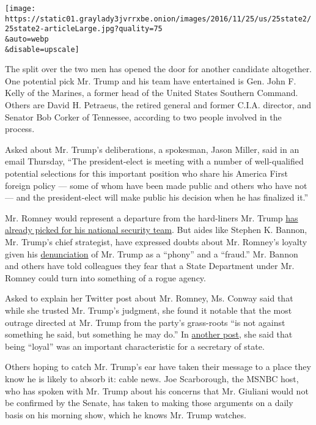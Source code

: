 \texttt{[image: https://static01.graylady3jvrrxbe.onion/images/2016/11/25/us/25state2/25state2-articleLarge.jpg?quality=75\\\&auto=webp\\\&disable=upscale]}

The split over the two men has opened the door for another candidate
altogether. One potential pick Mr. Trump and his team have entertained
is Gen. John F. Kelly of the Marines, a former head of the United States
Southern Command. Others are David H. Petraeus, the retired general and
former C.I.A. director, and Senator Bob Corker of Tennessee, according
to two people involved in the process.

Asked about Mr. Trump's deliberations, a spokesman, Jason Miller, said
in an email Thursday, ``The president-elect is meeting with a number of
well-qualified potential selections for this important position who
share his America First foreign policy --- some of whom have been made
public and others who have not --- and the president-elect will make
public his decision when he has finalized it.''

Mr. Romney would represent a departure from the hard-liners Mr. Trump
\href{http://www.nytimes3xbfgragh.onion/2016/11/19/us/politics/donald-trump-administration.html}{has
already picked for his national security team}. But aides like Stephen
K. Bannon, Mr. Trump's chief strategist, have expressed doubts about Mr.
Romney's loyalty given his
\href{http://www.nytimes3xbfgragh.onion/2016/03/04/us/politics/mitt-romney-speech.html}{denunciation}
of Mr. Trump as a ``phony'' and a ``fraud.'' Mr. Bannon and others have
told colleagues they fear that a State Department under Mr. Romney could
turn into something of a rogue agency.

Asked to explain her Twitter post about Mr. Romney, Ms. Conway said that
while she trusted Mr. Trump's judgment, she found it notable that the
most outrage directed at Mr. Trump from the party's grass-roots ``is not
against something he said, but something he may do.'' In
\href{https://twitter.com/KellyannePolls/status/801796408521138176}{another
post}, she said that being ``loyal'' was an important characteristic for
a secretary of state.

Others hoping to catch Mr. Trump's ear have taken their message to a
place they know he is likely to absorb it: cable news. Joe Scarborough,
the MSNBC host, who has spoken with Mr. Trump about his concerns that
Mr. Giuliani would not be confirmed by the Senate, has taken to making
those arguments on a daily basis on his morning show, which he knows Mr.
Trump watches.

